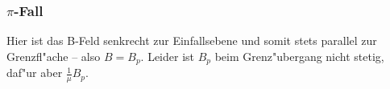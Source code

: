\documentclass[twoside,a4paper]{book}
\begin{document}
\subsubsection{$\pi$-Fall}
\label{kap_pi-fall}







Hier ist das B-Feld senkrecht zur Einfallsebene und somit stets
parallel zur Grenzfl"ache -- also $B = B_p$. Leider ist $B_p$ beim
Grenz"ubergang nicht stetig, daf"ur aber $\frac{1}{\mu} B_p$.
\end{document}

